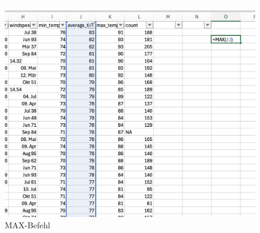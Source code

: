 \documentclass{article}
\begin{document}
\begin{figure} [h]
    \centering
    \includegraphics[width=0.8\linewidth]{Excel MAX.png}
    \caption{MAX-Befehl}
    \label{fig:enter-label}
\end{figure}
\end{document}
